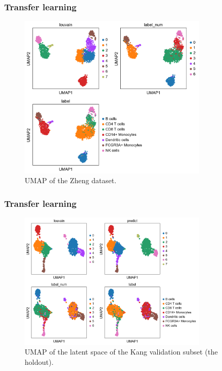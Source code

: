 \documentclass[final]{beamer}
\begin{document}
\begin{frame}
\frametitle{Transfer learning}
\begin{figure}[h]
\centering
\includegraphics[width=0.8\textwidth]{images/gmmvae_zheng_new_louvain_umap1.png}
\caption{
UMAP of the Zheng dataset.
}
\label{fig:zheng_pca_umap_new}
\end{figure}

\end{frame}


\begin{frame}
\frametitle{Transfer learning}
\begin{figure}[h]
\centering
\includegraphics[width=0.8\textwidth]{images/gmmvae_kang_new_latent_louvain_pred_umap1.png}
\caption{
UMAP of the latent space of the Kang validation subset (the holdout).
}
\label{fig:kang_new_latent}
\end{figure}
\end{frame}
\end{document}
